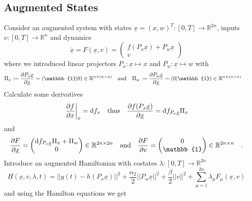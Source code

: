 \clearpage
\subsection{Augmented States}
	Consider an augmented system with states $\underline{x}=(x,w)^T:[0,T]\to 
	\mathbb{R}^{2n}$, inputs $v:[0,T]\to\mathbb{R}^n$ and dynamics
	\begin{equation}
	\dot{\underline{x}} = F\left(\underline{x},v\right) = 
	\begin{pmatrix}
	f(P_x \underline{x}) + P_w \underline{x} \\ v
	\end{pmatrix}
	\end{equation}
	where we introduced linear projectors $P_x:\underline{x}\mapsto x$ and $P_w:
	\underline{x}\mapsto w$ with
	\begin{equation}
	\Pi_x:= \frac{\partial P_x \underline{x}}{\partial \underline{x}} = (\mathbb{1}|0) \in \mathbb{R}^{n\times 
	(n+n)}
	\tab{and}
	\Pi_w:= \frac{\partial P_w \underline{x}}{\partial \underline{x}} = (0|\mathbb{1}) \in \mathbb{R}^{n\times 
	(n+n)} \quad .
	\end{equation}
	Calculate some derivatives
	\begin{equation}
	\left.\frac{\partial f}{\partial x}\right|_x = \text{d} f_x \quad \text{thus} \quad
	\frac{\partial f(P_x\underline{x})}{\partial \underline{x}} = \text{d} f_{P_x
	\underline{x}} \Pi_x 
	\end{equation}
	and 
	\begin{equation}
	\frac{\partial F}{\partial \underline{x}} = \begin{pmatrix}
	\td f_{P_x\underline{x}} \Pi_x + \Pi_w \\ 0
	\end{pmatrix} \in \mathbb{R}^{2n\times 2n} \tab{and}
	\frac{\partial F}{\partial v} = \begin{pmatrix}
	0 \\ \mathbb{1}
	\end{pmatrix}\in \mathbb{R}^{2n\times n} \quad .
	\end{equation}
	Introduce an augmented Hamiltonian with costates $\lambda:[0,T]\to \mathbb{R}^{2n}$
	\begin{equation}
	\underline{H}\left(\underline{x},v,\lambda,t\right) = 
	|| y(t) - h(P_x\underline{x}) ||^2 + \frac{\alpha_2}{2} ||P_w \underline{x}||^2 
	+ \frac{\beta}{2} ||v||^2 + \sum\limits_{\mu=1}^{2n} \lambda_\mu 
	F_\mu\left(\underline{x},v\right)
	\end{equation}
	and using the Hamilton equations we get
